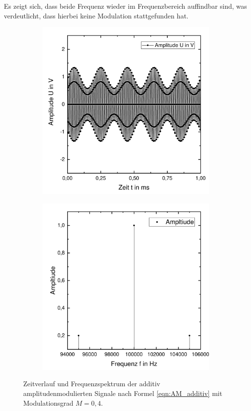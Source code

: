 \documentclass[a4paper,twoside,final]{article}
\begin{document}
Es zeigt sich, dass beide Frequenz wieder im Frequenzbereich auffindbar sind, was verdeutlicht, dass hierbei keine Modulation stattgefunden hat.
\begin{figure}[htp]
    \centering
    \begin{subfigure}{0.45\textwidth}
        \includegraphics[width=\textwidth]{Bilder/AM1_additiv_Zeit.pdf}
    \end{subfigure}
    \begin{subfigure}{0.45\textwidth}
        \includegraphics[width=\textwidth]{Bilder/AM1_additiv_Frequenz.pdf}
    \end{subfigure}
    \caption{Zeitverlauf und Frequenzspektrum der additiv amplitudenmodulierten Signale nach Formel \eqref{eqn:AM_additiv} mit Modulationsgrad $M = 0,4$.}
    \label{fig:AM1_additiv}
\end{figure}\\
\end{document}
